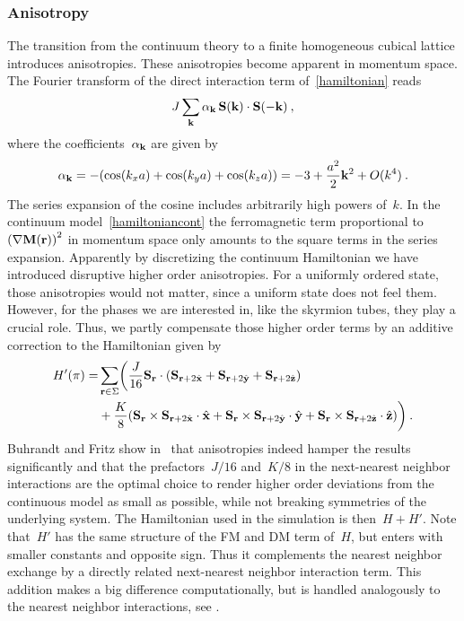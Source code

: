 \subsubsection{Anisotropy}

The transition from the continuum theory to a finite homogeneous cubical lattice
introduces anisotropies. These anisotropies become apparent in momentum space.
The Fourier transform of the direct interaction term of~\eqref{hamiltonian}
reads
%
\begin{equation}
  J \sum_{\mathbf{k}} \alpha_{\mathbf{k}}\, \mathbf{S} (\mathbf{k}) \cdot \mathbf{S} (- \mathbf{k}) \:,
\end{equation}
%
where the coefficients~$\alpha_{\mathbf{k}}$ are given by
%
\begin{equation}
  \alpha_{\mathbf{k}} = - (\cos (k_x a) + \cos (k_y a) + \cos (k_z a) ) =
  -3 + \frac{a^2}{2} \mathbf{k}^2 + O(k^4) \:.
\end{equation}
%
The series expansion of the cosine includes arbitrarily high powers of~$k$. In
the continuum model~\eqref{hamiltoniancont} the ferromagnetic term proportional
to~${( \nabla \mathbf{M} (\mathbf{r}) )}^2$ in momentum space only amounts to the square terms
in the series expansion. Apparently by discretizing the continuum Hamiltonian we
have introduced disruptive higher order anisotropies. For a uniformly ordered
state, those anisotropies would not matter, since a uniform state does not feel
them. However, for the phases we are interested in, like the skyrmion tubes,
they play a crucial role. Thus, we partly compensate those higher order terms
by an additive correction to the Hamiltonian given by
%
\begin{align}\label{hamiltonianfix}
  H'(\pi) = & \sum_{\mathbf{r} \in \Sigma} \biggl(
  \frac{J}{16} \mathbf{S}_{\mathbf{r}} \cdot (\mathbf{S}_{\mathbf{r}+2\hat{\mathbf{x}}} + \mathbf{S}_{\mathbf{r}+2\hat{\mathbf{y}}} + \mathbf{S}_{\mathbf{r}+2\hat{\mathbf{z}}})\nonumber \\
  &+ \frac{K}{8} (\mathbf{S}_{\mathbf{r}} \times \mathbf{S}_{\mathbf{r}+2\hat{\mathbf{x}}} \cdot \hat{\mathbf{x}} +
        \mathbf{S}_{\mathbf{r}} \times \mathbf{S}_{\mathbf{r}+2\hat{\mathbf{y}}} \cdot \hat{\mathbf{y}} +
        \mathbf{S}_{\mathbf{r}} \times \mathbf{S}_{\mathbf{r}+2\hat{\mathbf{z}}} \cdot \hat{\mathbf{z}})\biggr)\:.
\end{align}
%
Buhrandt and Fritz show in~\cite{skyrmion} that anisotropies indeed hamper the
results significantly and that the prefactors~$J/16$ and~$K/8$ in the
next-nearest neighbor interactions are the optimal choice to render higher order
deviations from the continuous model as small as possible, while not breaking
symmetries of the underlying system. The Hamiltonian used in the simulation is
then~$H + H'$. Note that~$H'$ has the same structure of the FM and DM term
of~$H$, but enters with smaller constants and opposite sign. Thus it complements
the nearest neighbor exchange by a directly related next-nearest neighbor
interaction term. This addition makes a big difference computationally, but is
handled analogously to the nearest neighbor interactions, see
.

